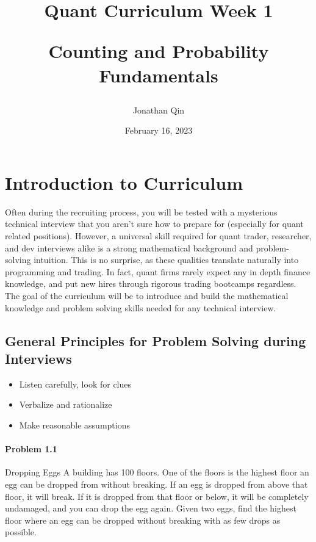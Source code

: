\documentclass{article}
\title{

\begin{center} \textbf{Quant Curriculum Week 1}

Counting and Probability Fundamentals \end{center}
}
\author{Jonathan Qin}
\date{February 16, 2023}
\begin{document}
\maketitle

\section{Introduction to Curriculum}

Often during the recruiting process, you will be tested with a mysterious technical interview that you aren't sure how to prepare for (especially for quant related positions). However, a universal skill required for quant trader, researcher, and dev interviews alike is a strong mathematical background and problem-solving intuition. This is no surprise, as these qualities translate naturally into programming and trading. In fact, quant firms rarely expect any in depth finance knowledge, and put new hires through rigorous trading bootcamps regardless. The goal of the curriculum will be to introduce and build the mathematical knowledge and problem solving skills needed for any technical interview. 

\subsection{General Principles for Problem Solving during Interviews}
\begin{itemize}
    \item Listen carefully, look for clues 
    \item Verbalize and rationalize 
    \item Make reasonable assumptions
\end{itemize}

\paragraph{Problem 1.1} Dropping Eggs
\newline
\newline
A building has 100 floors. One of the floors is the highest floor an egg can be dropped from without breaking.
If an egg is dropped from above that floor, it will break. If it is dropped from that floor or below, it will be completely undamaged, and you can drop the egg again. Given two eggs, find the highest floor where an egg can be dropped without breaking with as few drops as possible. 
\newline
\end{document}
